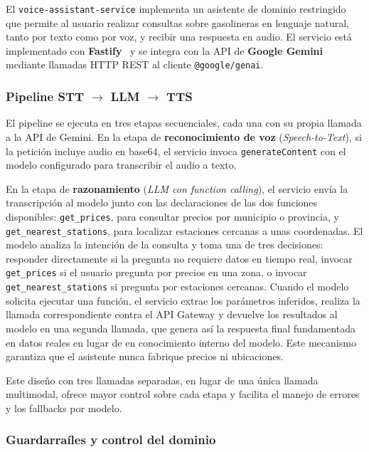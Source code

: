 El \texttt{voice-assistant-service} implementa un asistente de dominio restringido que
permite al usuario realizar consultas sobre gasolineras en lenguaje natural, tanto por
texto como por voz, y recibir una respuesta en audio. El servicio está implementado con
\textbf{Fastify}~\cite{fastify} y se integra con la API de \textbf{Google Gemini}~\cite{gemini_2_5}
mediante llamadas HTTP REST al cliente \texttt{@google/genai}.

\subsubsection*{Pipeline STT $\rightarrow$ LLM $\rightarrow$ TTS}

El pipeline se ejecuta en tres etapas secuenciales, cada una con su propia llamada a la
API de Gemini. En la etapa de \textbf{reconocimiento de voz} (\textit{Speech-to-Text}),
si la petición incluye audio en base64, el servicio invoca \texttt{generateContent} con
el modelo configurado para transcribir el audio a texto. 

En la etapa de \textbf{razonamiento} 
(\textit{LLM con function calling}),
el servicio envía la transcripción al modelo junto con las declaraciones
de las dos funciones disponibles: \texttt{get\_prices}, para consultar
precios por municipio o provincia, y \texttt{get\_nearest\_stations}, para
localizar estaciones cercanas a unas coordenadas. El modelo analiza la
intención de la consulta y toma una de tres decisiones: responder
directamente si la pregunta no requiere datos en tiempo real, invocar
\texttt{get\_prices} si el usuario pregunta por precios en una zona, o
invocar \texttt{get\_nearest\_stations} si pregunta por estaciones
cercanas. Cuando el modelo solicita ejecutar una función, el servicio
extrae los parámetros inferidos, realiza la llamada correspondiente
contra el API Gateway y devuelve los resultados al modelo en una segunda
llamada, que genera así la respuesta final fundamentada en datos reales
en lugar de en conocimiento interno del modelo. Este mecanismo garantiza
que el asistente nunca fabrique precios ni ubicaciones.

Este diseño con tres llamadas separadas, en lugar de una única llamada multimodal, ofrece
mayor control sobre cada etapa y facilita el manejo de errores y los fallbacks por modelo.

\subsubsection*{Guardarraíles y control del dominio}

